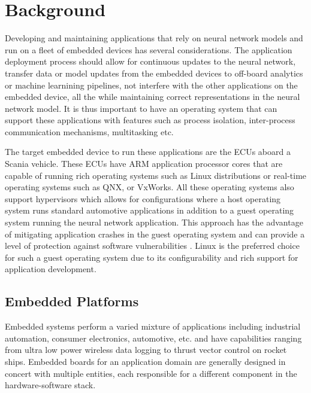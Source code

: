 
\chapter{Background}

Developing and maintaining applications that rely on neural network models and run on a fleet of embedded devices has several considerations. The application deployment process should allow for continuous updates to the neural network, transfer data or model updates from the embedded devices to off-board analytics or machine learnining pipelines, not interfere with the other applications on the embedded device, all the while maintaining correct representations in the neural network model. It is thus important to have an operating system that can support these applications with features such as process isolation, inter-process communication mechanisms, multitasking etc.

The target embedded device to run these applications are the ECUs aboard a Scania vehicle. These ECUs have ARM application processor cores that are capable of running rich operating systems such as Linux distributions or real-time operating systems such as QNX, or VxWorks. All these operating systems also support hypervisors which allows for configurations where a host operating system runs standard automotive applications in addition to a guest operating system running the neural network application. This approach has the advantage of mitigating application crashes in the guest operating system and can provide a level of protection against software vulnerabilities \cite{Linux-guest-os}. Linux is the preferred choice for such a guest operating system due to its configurability and rich support for application development.

\section{Embedded Platforms}

Embedded systems perform a varied mixture of applications including industrial automation, consumer electronics, automotive, etc. and have capabilities ranging from ultra low power wireless data logging to thrust vector control on rocket ships. Embedded boards for an application domain are generally designed in concert with multiple entities, each responsible for a different component in the hardware-software stack.

